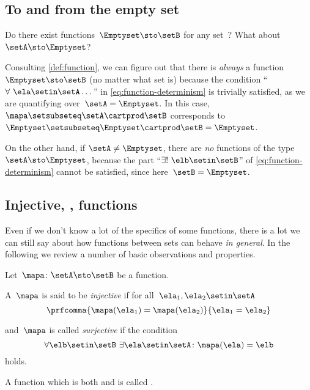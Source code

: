\subsection{To and from the empty set}

Do there exist functions~$\Emptyset \sto \setB$ for any set~\setB?
What about~$\setA \sto \Emptyset$?

Consulting \cref{def:function}, we can figure out that there is \emph{always} a function $\Emptyset \sto \setB$ (no matter what set \setB is) because the condition ``$\forall \ \ela \setin\setA \dots$'' in \cref{eq:function-determinism} is trivially satisfied, as we are quantifying over~$\setA = \Emptyset$.
In this case,~$\mapa \setsubseteq \setA \cartprod \setB$ corresponds to~$\Emptyset \setsubseteq \Emptyset \cartprod \setB = \Emptyset$.

On the other hand, if $\setA \neq \Emptyset$, there are \emph{no} functions of the type~$\setA \sto \Emptyset$, because the part ``$\exists ! \ \elb \setin\setB$'' of \cref{eq:function-determinism} cannot be satisfied, since here~$\setB = \Emptyset$.

\subsection{Injective, ,  functions}
\label{sub:injective-and-surjective}

Even if we don't know a lot of the specifics of some functions, there is a lot we can still say about how functions between sets can behave \emph{in general}.
In the following we review a number of basic observations and properties.

Let~$\mapa\colon \setA \sto \setB$ be a function.
\begin{ctdefinition}\label{def:injective-function}
    A~$\mapa$ is said to be \emph{injective} if for all~$\ela_1, \ela_2 \setin\setA$
    \begin{equation}
        \label{eq:injectivity-cond}
        \prfcomma{
            \mapa(\ela_1) = \mapa(\ela_2)
        }{
            \ela_1 = \ela_2
        }
    \end{equation}
\end{ctdefinition}

\begin{ctdefinition}\label{def:surjective-function}
    and~$\mapa$ is called \emph{surjective} if the condition
    \begin{equation}
        \label{eq:surjectivity-cond}
        \forall \elb \setin\setB \ \exists \ela \setin\setA \colon \mapa(\ela) = \elb
    \end{equation}
    holds.
\end{ctdefinition}
\begin{ctdefinition}\label{def:bijective-function}
    A function which is both  and  is called .
\end{ctdefinition}

